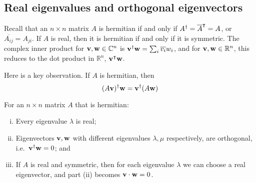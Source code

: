 \subsection{Real eigenvalues and orthogonal eigenvectors}
Recall that an \(n\times n\) matrix \(A\) is hermitian if and only if \(A^\dagger = \overline{A}^\intercal = A\), or \(\overline{A_{ij}} = A_{ji}\).
If \(A\) is real, then it is hermitian if and only if it is symmetric.
The complex inner product for \(\vb v, \vb w \in \mathbb C^n\) is \(\vb v^\dagger \vb w = \sum_i \overline{v_i}w_i\), and for \(\vb v, \vb w \in \mathbb R^n\), this reduces to the dot product in \(\mathbb R^n\), \(\vb v^\intercal \vb w\).

Here is a key observation.
If \(A\) is hermitian, then
\[
	(A\vb v)^\dagger \vb w = \vb v^\dagger (A \vb w)
\]
\begin{theorem}
	For an \(n \times n\) matrix \(A\) that is hermitian:
	\begin{enumerate}[(i)]
		\item Every eigenvalue \(\lambda\) is real;
		\item Eigenvectors \(\vb v, \vb w\) with different eigenvalues \(\lambda, \mu\) respectively, are orthogonal, i.e.\ \(\vb v^\dagger \vb w = 0\); and
		\item If \(A\) is real and symmetric, then for each eigenvalue \(\lambda\) we can choose a real eigenvector, and part (ii) becomes \(\vb v \cdot \vb w = 0\).
	\end{enumerate}
\end{theorem}
